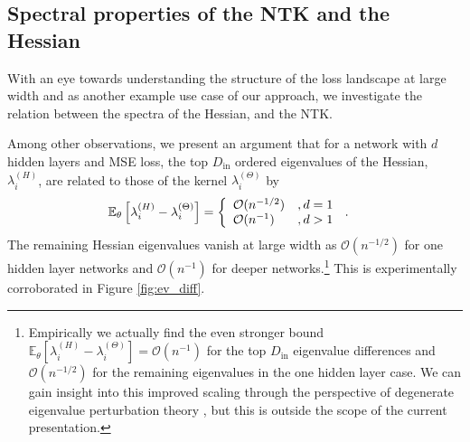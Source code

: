 \documentclass[english]{article}
\newcommand{\Din}{\ensuremath{D_{\mathrm{in}}}}
\newcommand{\es}[2] {\begin{align} \label{#1} #2 \end{align}}
\newcommand{\lexpp}[1]{\mathbb{E}_{#1}\left[}
\newcommand{\rexp}{\right]}
\newcommand{\pcite}[1]{\cite{#1}}
\begin{document}
\subsection{Spectral properties of the NTK and the Hessian}\label{app:spectrum}
With an eye towards understanding the structure of the loss landscape at large width and as another example use case of our approach, we investigate the relation between the spectra of the Hessian, and the NTK. 

Among other observations, we present an argument that for a network with $d$ hidden layers and MSE loss, the top $\Din$ ordered eigenvalues of the Hessian, $\lambda_{i}^{(H)}$, are related to those of the kernel $\lambda_{i}^{(\Theta)}$ by
\es{evrel}{
\lexpp{\theta}\lambda_{i}^{(H)} - \lambda_{i}^{(\Theta)}\rexp&=
\left\{
\begin{array}{l l }
\mathcal{O}(n^{-1/2}) &, d = 1\\
\mathcal{O}(n^{-1}) &, d > 1
\end{array}
\right.\,.
}
The remaining Hessian eigenvalues vanish at large width as $\mathcal{O}(n^{-1/2})$ for one hidden layer networks and $\mathcal{O}(n^{-1})$ for deeper networks.\footnote{Empirically we actually find the even stronger bound $\lexpp{\theta}\lambda_{i}^{(H)} - \lambda_{i}^{(\Theta)}\rexp=\mathcal{O}(n^{-1})$ for the top $\Din$ eigenvalue differences and $\mathcal{O}(n^{-1/2})$ for the remaining eigenvalues in the one hidden layer case. We can gain insight into this improved scaling through the perspective of degenerate eigenvalue perturbation theory \pcite{trefethen97}, but this is outside the scope of the current presentation.}
This is experimentally corroborated in Figure \ref{fig:ev_diff}.
\end{document}
